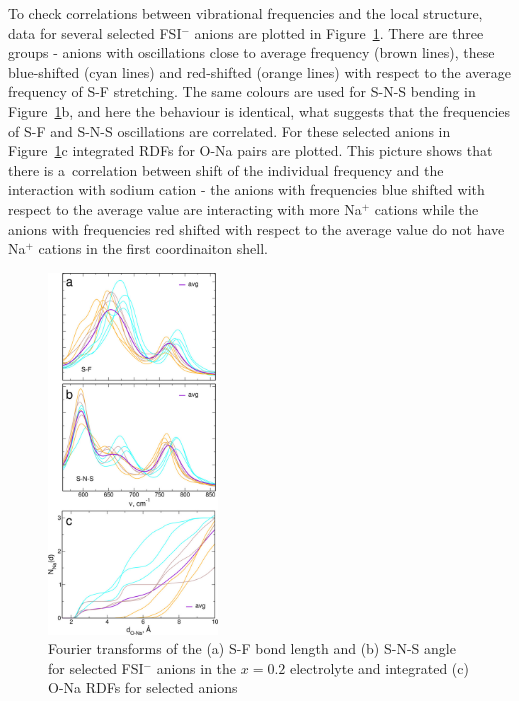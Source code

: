 To check correlations between vibrational frequencies and the local structure, data for several selected FSI$^{-}$ anions are plotted in Figure~\ref{fig:emim-fsi-fourier-rdf}. There are three groups - anions with oscillations close to average frequency (brown lines), these blue-shifted (cyan lines) and red-shifted (orange lines) with respect to the average frequency of S-F stretching. The same colours are used for S-N-S bending in Figure~\ref{fig:emim-fsi-fourier-rdf}b, and here the behaviour is identical, what suggests that the frequencies of S-F and S-N-S oscillations are correlated. For these selected anions in Figure~\ref{fig:emim-fsi-fourier-rdf}c integrated RDFs for O-Na pairs are plotted. This picture shows that there is a~correlation between shift of the individual frequency and the interaction with sodium cation - the anions with frequencies blue shifted with respect to the average value are interacting with more Na$^{+}$ cations while the anions with frequencies red shifted with respect to the average value do not have Na$^{+}$ cations in the first coordinaiton shell.

\begin{figure}
    \centering
    \includegraphics[width=0.4\textwidth]{img/4-ir-spectra-from-aimd-simulations/1-emim-fsi/fourier-rdf.png}
    \caption{Fourier transforms of the (a) S-F bond length and (b) S-N-S angle for selected FSI$^{-}$ anions in the $x = 0.2$ electrolyte and integrated (c) O-Na RDFs for selected anions}
    \label{fig:emim-fsi-fourier-rdf}
\end{figure}

